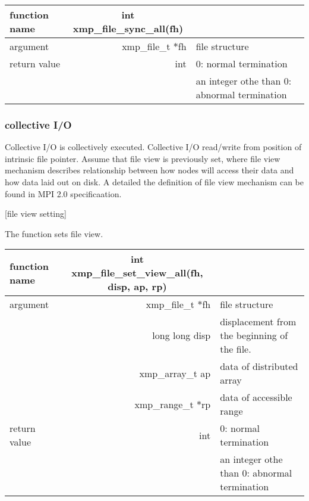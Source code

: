    \begin{table}[h]
    \begin{center}
     \begin{tabular}{l|r|p{70mm}}
      \hline
      {\bf function name}  & \multicolumn{1}{c}{\bf int
      xmp\_file\_sync\_all(fh)} &  \\ \hline
      argument & xmp\_file\_t $*$fh & file structure \\ \hline
      return value & int & 0: normal termination \\
      &  & an integer othe than 0: abnormal termination \\ \hline
      \end{tabular}
     \end{center}
    \label{tb:aaa}
   \end{table}

   \clearpage

   \subsubsection{collective I/O}

   Collective I/O is collectively executed.
   Collective I/O read/write from position of intrinsic file pointer.
   Assume that file view is previously set, where file view mechanism
   describes relationship between how nodes will access their data
   and how data laid out on disk.
   A detailed the definition of file view mechanism can be found in MPI
   2.0 specificaation.

   [file view setting]

   The function sets file view.

   \begin{table}[h]
    \begin{center}
     \begin{tabular}{l|r|p{70mm}}
      \hline
      {\bf function name}  & \multicolumn{1}{c}{\bf int xmp\_file\_set\_view\_all(fh,
      disp, ap, rp)} &  \\ \hline
      argument & xmp\_file\_t $*$fh & file structure \\ \cline{2-3}
      & long long disp & displacement from the beginning of the file. \\ \cline{2-3}
      & xmp\_array\_t ap & data of distributed array \\ \cline{2-3}
      & xmp\_range\_t $*$rp & data of accessible range \\ \hline
      return value & int & 0: normal termination \\
      &  & an integer othe than 0: abnormal termination \\ \hline
      \end{tabular}
     \end{center}
    \label{tb:aaa}
   \end{table}

